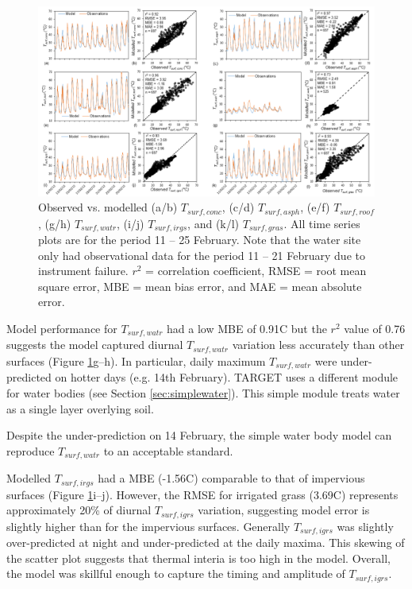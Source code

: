 \documentclass[journal abbreviation, manuscript]{copernicus}
\begin{document}
\begin{figure}
\includegraphics[width=1\textwidth]{figure4.png}
\caption{Observed vs. modelled (a/b) $T_{surf,conc}$, (c/d) $ T_{surf,asph}$, (e/f) $T_{surf,roof}$, (g/h) $T_{surf,watr}$, (i/j) $T_{surf,irgs}$, and (k/l)  $T_{surf,gras}$. All time series plots are for the period 11 -- 25 February. Note that the water site only had observational data for the period 11 -- 21 February due to instrument failure. $r^{2}$ = correlation coefficient, RMSE = root mean square error, MBE = mean bias error, and MAE = mean absolute error. }\label{fig:Tsurf_panel}
\end{figure}




Model performance for  $T_{surf,watr}$ had a low MBE of 0.91\degree C but the $r^{2}$ value of 0.76 suggests the model captured diurnal $T_{surf,watr}$  variation less accurately than other surfaces (Figure \ref{fig:Tsurf_panel}g--h). In particular, daily maximum $T_{surf,watr}$ were under-predicted on hotter days (e.g. 14th February). TARGET uses a different module for water bodies (see Section \ref{sec:simplewater}). This simple module treats water as a single layer overlying soil. 
  
Despite the under-prediction on 14 February, the simple water body model can reproduce  $T_{surf,watr}$ to an acceptable standard. 

Modelled $T_{surf,irgs}$ had a MBE (-1.56\degree C) comparable to that of impervious surfaces (Figure \ref{fig:Tsurf_panel}i--j). However, the RMSE for irrigated grass (3.69\degree C) represents approximately 20\% of diurnal $T_{surf,igrs}$ variation, suggesting model error is slightly higher than for the impervious surfaces. Generally  $T_{surf,igrs}$ was slightly over-predicted at night  and under-predicted at the daily maxima. This skewing of the scatter plot suggests that thermal interia is too high in the model. Overall, the model was skillful enough to capture the timing and amplitude of  $T_{surf,igrs}$. 
\end{document}

